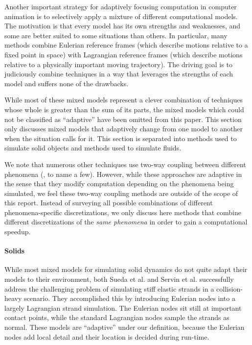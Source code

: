 Another important strategy for adaptively focusing computation in computer animation is to selectively apply a mixture of different computational models. The motivation is that every model has its own strengths and weaknesses, and some are better suited to some situations than others. In particular, many methods combine Eulerian reference frames (which describe motions relative to a fixed point in space) with Lagrangian reference frames (which describe motions relative to a physically important moving trajectory). The driving goal is to judiciously combine techniques in a way that leverages the strengths of each model and suffers none of the drawbacks.

While most of these mixed models represent a clever combination of techniques whose whole is greater than the sum of its parts, the mixed models which could not be classified as ``adaptive'' have been omitted from this paper. This section only discusses mixed models that adaptively change from one model to another when the situation calls for it.
This section is separated into methods used to simulate solid objects and methods used to simulate fluids.

We note that numerous other techniques use two-way coupling between different phenomena (\hspace{1sp}\cite{carlson2004rigid,robinson2008two,shinar2008two,remillard2013embedded}, to name a few). However, while these approaches are adaptive in the sense that they modify computation depending on the phenomena being simulated, we feel these two-way coupling methods are outside of the scope of this report. Instead of surveying all possible combinations of different phenomena-specific discretizations, we only discuss here methods that combine different discretizations of the {\em same phenomena} in order to gain a computational speedup.

\paragraph{Solids}

While most mixed models for simulating solid dynamics do not quite adapt their models to their environment, both Sueda et al. \cite{Sueda2011} and Servin et al. \cite{Servin2011} successfully address the challenging problem of simulating stiff elastic strands in a collision-heavy scenario. They accomplished this by introducing Eulerian nodes into a largely Lagrangian strand simulation. The Eulerian nodes sit still at important contact points, while the standard Lagrangian nodes sample the strands as normal. These models are ``adaptive'' under our definition, because the Eulerian nodes add local detail and their location is decided during run-time.


